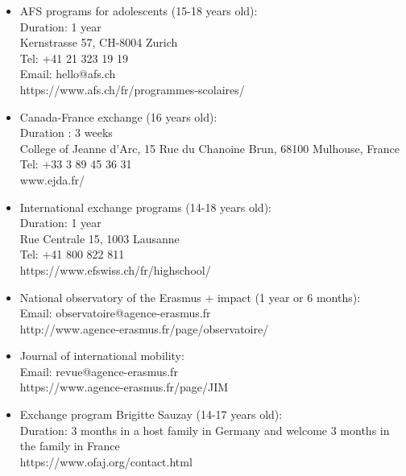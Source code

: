 \begin{itemize}
\item AFS programs for adolescents (15-18 years old): \\
Duration: 1 year \\
Kernstrasse 57, CH-8004 Zurich \\
Tel: +41 21 323 19 19 \\
Email: hello@afs.ch \\
https://www.afs.ch/fr/programmes-scolaires/ 

\vspace{4pt}
\item Canada-France exchange (16 years old): \\
Duration : 3 weeks \\
College of Jeanne d'Arc, 15 Rue du Chanoine Brun, 68100 Mulhouse, France \\
Tel: +33 3 89 45 36 31 \\
www.ejda.fr/ 

\vspace{4pt}
\item International exchange programs (14-18 years old): \\
Duration: 1 year \\
Rue Centrale 15, 1003 Lausanne \\
Tel: +41 800 822 811 \\
https://www.efswiss.ch/fr/highschool/ 

\vspace{4pt}
\item National observatory of the Erasmus + impact (1 year or 6 months): \\
Email: observatoire@agence-erasmus.fr \\
http://www.agence-erasmus.fr/page/observatoire/

\vspace{4pt}
\item Journal of international mobility:\\
Email: revue@agence-erasmus.fr \\
https://www.agence-erasmus.fr/page/JIM

\vspace{4pt}
\item Exchange program Brigitte Sauzay (14-17 years old): \\
Duration: 3 months in a host family in Germany and welcome 3 months in the family in France \\
https://www.ofaj.org/contact.html 


\end{itemize}
